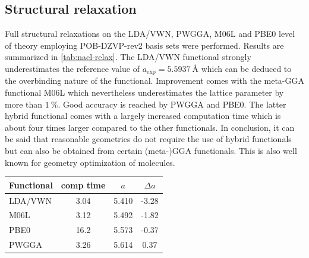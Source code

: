 \documentclass[a4paper,12pt]{scrartcl}
\begin{document}
\subsection{Structural relaxation}
%
Full structural relaxations on the LDA/VWN\autocite[]{lda-vwn}, PWGGA\autocite[]{pwgga}, M06L\autocite[]{m06l} and PBE0\autocite[]{pbe0} level of theory employing POB-DZVP-rev2 basis sets\autocite[]{pob-xzvp-rev2} were performed. Results are summarized in \autoref{tab:nacl-relax}. The LDA/VWN functional strongly underestimates the reference value of $ a_\mathrm{exp} = \SI{5.5937}{\angstrom} $ which can be deduced to the overbinding nature of the functional. Improvement comes with the meta-GGA functional M06L which nevertheless underestimates the lattice parameter by more than $ \SI{1}{\percent} $. Good accuracy is reached by PWGGA and PBE0. The latter hybrid functional comes with a largely increased computation time which is about four times larger compared to the other functionals. In conclusion, it can be said that reasonable geometries do not require the use of hybrid functionals but can also be obtained from certain (meta-)GGA functionals. This is also well known for geometry optimization of molecules.\autocite[]{tpss,r2-scan-3c}
%
\begin{table}[H]
	\centering
	\label{tab:nacl-relax}
	\begin{tabular}{lccc}
		\toprule
		Functional & comp time & $a $  & $ \Delta a $ \\
		\midrule
		LDA/VWN    & 3.04      & 5.410 & -3.28        \\
		M06L       & 3.12      & 5.492 & -1.82        \\
		PBE0       & 16.2      & 5.573 & -0.37        \\
		PWGGA      & 3.26      & 5.614 & 0.37         \\
		\bottomrule
	\end{tabular}
\end{table}
%
\end{document}
